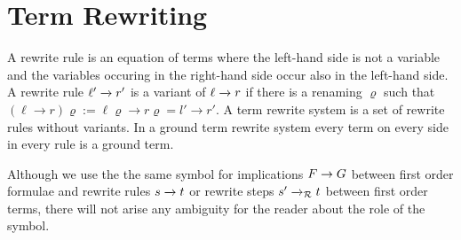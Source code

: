 

\section{Term Rewriting}\label{sec:termrewriting}




\begin{definition}\label{def:rewriterule}
	A {\myem rewrite rule} is an equation of terms where the left-hand side is not a variable
	and the variables occuring in the right-hand side occur also in the left-hand side.
	A rewrite rule $\ell'\xrightarrow[{}]{} r'$ is a {\myem variant} of $\ell\xrightarrow[{}]{} r$ if there is a renaming $\varrho$
	such that
	$(\ell\rightarrow r)\varrho := \ell\varrho\rightarrow r\varrho = l'\rightarrow r'$.
	A {\myem term rewrite system} is a set of rewrite rules without variants.
	In a {\myem ground} term rewrite system every term on every side in every rule is a ground term.
\end{definition}

Although we use the the same symbol for implications $F\rightarrow G$ between first order formulae
and rewrite rules $s\xrightarrow[{}]{} t$ or rewrite steps $s'\xrightarrow[{}]{}_{\mathcal R} t$ between first order terms,
there will not arise any ambiguity for the reader about the role of the symbol.

